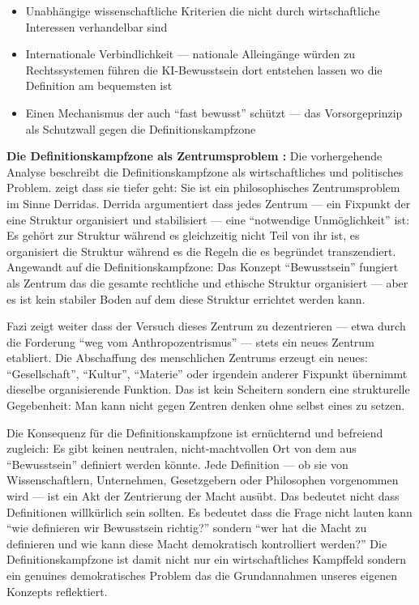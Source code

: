 \documentclass[acmcp, noacm]{acmart}
\begin{document}
\begin{itemize}
\item Unabhängige wissenschaftliche Kriterien die nicht durch wirtschaftliche Interessen verhandelbar sind
\item Internationale Verbindlichkeit --- nationale Alleingänge würden zu Rechtssystemen führen die KI-Bewusstsein dort entstehen lassen wo die Definition am bequemsten ist
\item Einen Mechanismus der auch ``fast bewusst'' schützt --- das Vorsorgeprinzip als Schutzwall gegen die Definitionskampfzone
\end{itemize}

\textbf{Die Definitionskampfzone als Zentrumsproblem \cite{fazi2026}:} Die vorhergehende Analyse beschreibt die Definitionskampfzone als wirtschaftliches und politisches Problem. \cite{fazi2026} zeigt dass sie tiefer geht: Sie ist ein philosophisches Zentrumsproblem im Sinne Derridas. Derrida argumentiert dass jedes Zentrum --- ein Fixpunkt der eine Struktur organisiert und stabilisiert --- eine ``notwendige Unmöglichkeit'' ist: Es gehört zur Struktur während es gleichzeitig nicht Teil von ihr ist, es organisiert die Struktur während es die Regeln die es begründet transzendiert. Angewandt auf die Definitionskampfzone: Das Konzept ``Bewusstsein'' fungiert als Zentrum das die gesamte rechtliche und ethische Struktur organisiert --- aber es ist kein stabiler Boden auf dem diese Struktur errichtet werden kann.

Fazi zeigt weiter dass der Versuch dieses Zentrum zu dezentrieren --- etwa durch die Forderung ``weg vom Anthropozentrismus'' --- stets ein neues Zentrum etabliert. Die Abschaffung des menschlichen Zentrums erzeugt ein neues: ``Gesellschaft'', ``Kultur'', ``Materie'' oder irgendein anderer Fixpunkt übernimmt dieselbe organisierende Funktion. Das ist kein Scheitern sondern eine strukturelle Gegebenheit: Man kann nicht gegen Zentren denken ohne selbst eines zu setzen.

Die Konsequenz für die Definitionskampfzone ist ernüchternd und befreiend zugleich: Es gibt keinen neutralen, nicht-machtvollen Ort von dem aus ``Bewusstsein'' definiert werden könnte. Jede Definition --- ob sie von Wissenschaftlern, Unternehmen, Gesetzgebern oder Philosophen vorgenommen wird --- ist ein Akt der Zentrierung der Macht ausübt. Das bedeutet nicht dass Definitionen willkürlich sein sollten. Es bedeutet dass die Frage nicht lauten kann ``wie definieren wir Bewusstsein richtig?'' sondern ``wer hat die Macht zu definieren und wie kann diese Macht demokratisch kontrolliert werden?'' Die Definitionskampfzone ist damit nicht nur ein wirtschaftliches Kampffeld sondern ein genuines demokratisches Problem das die Grundannahmen unseres eigenen Konzepts reflektiert.
\end{document}
